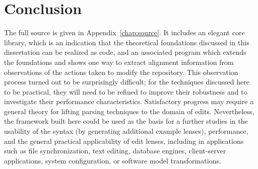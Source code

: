 \section{Conclusion}
\label{sec:impl-conclusion}
The full source is given in Appendix~\ref{chap:source}. It includes an
elegant core library, which is an indication that the theoretical
foundations discussed in this dissertation can be realized as code, and an
associated program which extends the foundations and shows one way to
extract alignment information from observations of the actions taken to
modify the repository. This observation process turned out to be
surprisingly difficult; for the techniques discussed here to be practical,
they will need to be refined to improve their robustness and to investigate
their performance characteristics. Satisfactory progress may require a
general theory for lifting parsing techniques to the domain of edits.
Nevertheless, the framework built here could be used as the basis for a
further studies in the usability of the syntax (by generating additional
example lenses), performance, and the general practical applicability of
edit lenses, including in applications such as file synchronization, text
editing, database engines, client-server applications, system configuration,
or software model transformations.
